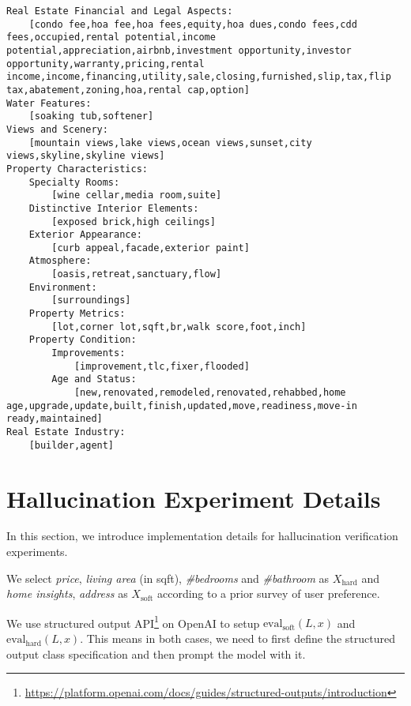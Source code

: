 \begin{lstlisting}
Real Estate Financial and Legal Aspects:
    [condo fee,hoa fee,hoa fees,equity,hoa dues,condo fees,cdd fees,occupied,rental potential,income potential,appreciation,airbnb,investment opportunity,investor opportunity,warranty,pricing,rental income,income,financing,utility,sale,closing,furnished,slip,tax,flip tax,abatement,zoning,hoa,rental cap,option]
Water Features:
    [soaking tub,softener]
Views and Scenery:
    [mountain views,lake views,ocean views,sunset,city views,skyline,skyline views]
Property Characteristics:
    Specialty Rooms:
        [wine cellar,media room,suite]
    Distinctive Interior Elements:
        [exposed brick,high ceilings]
    Exterior Appearance:
        [curb appeal,facade,exterior paint]
    Atmosphere:
        [oasis,retreat,sanctuary,flow]
    Environment:
        [surroundings]
    Property Metrics:
        [lot,corner lot,sqft,br,walk score,foot,inch]
    Property Condition:
        Improvements:
            [improvement,tlc,fixer,flooded]
        Age and Status:
            [new,renovated,remodeled,renovated,rehabbed,home age,upgrade,update,built,finish,updated,move,readiness,move-in ready,maintained]
Real Estate Industry:
    [builder,agent]

\end{lstlisting}

\section{Hallucination Experiment Details}
\label{app: hallucination_experiments_details}
In this section, we introduce implementation details for hallucination verification experiments. 

We select \textit{price}, \textit{living area} (in sqft), \textit{\#{bedrooms}} and \textit{\#{bathroom}} as $X_{\text{hard}}$ and \textit{home insights}, \textit{address} as $X_{\text{soft}}$  according to a prior survey of user preference. 

We use structured output API\footnote{\url{https://platform.openai.com/docs/guides/structured-outputs/introduction}} on OpenAI to setup 
$\text{eval}_{\text{soft}}(L, x)$ {and} $\text{eval}_{\text{hard}}(L, x)$. This means in both cases, we need to first define the structured output class specification and then prompt the model with it.

